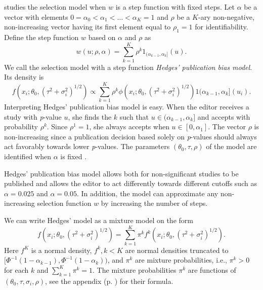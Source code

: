 \documentclass[article]{ajs}
\numberwithin{equation}{section}
\numberwithin{figure}{section}
\theoremstyle{plain}
\theoremstyle{definition}
\theoremstyle{definition}
\theoremstyle{plain}
\renewcommand{\sqrt}[1]{{(#1)^{1/2}}}
\begin{document}
\citet{hedges1992modeling} studies the selection model when $w$ is a step function with fixed steps. Let $\alpha$ be a vector with elements $0=\alpha_{0}<\alpha_{1}<\ldots<\alpha_{K}=1$ and $\rho$ be a $K$-ary non-negative, non-increasing vector having its first element equal to $\rho_{1}=1$ for identifiability. Define the step function $w$ based on $\alpha$ and $\rho$ as
\begin{equation}
w(u;\rho,\alpha)=\sum_{k=1}^{K}\rho^{k}1_{(\alpha_{k-1},\alpha_{k}]}(u).\label{eq:step function}
\end{equation}
We call the selection model with a step function \emph{Hedges' publication bias model}. Its density is
\begin{equation}
f(x_{i};\theta_{0},\sqrt{\tau^{2}+\sigma_{i}^{2}})\propto\sum_{k=1}^{K}\rho^{k}\phi(x_{i};\theta_{0},\sqrt{\tau^{2}+\sigma_{i}^{2}})1{(\alpha_{k-1},\alpha_{k}]}(u_{i}).\label{eq:hedges model}
\end{equation}
Interpreting Hedges' publication bias model is easy. When the editor receives a study with \textit{p}-value $u$, she finds the $k$ such that $u\in(\alpha_{k-1},\alpha_{k}]$ and accepts with probability $\rho^{k}$. Since $\rho^{1}=1$, she always accepts when $u\in[0,\alpha_{1}]$. The vector $\rho$ is non-increasing since a publication decision based solely on \textit{p}-values should always act favorably towards lower \textit{p}-values. The parameters $(\theta_{0},\tau,\rho)$ of the model are identified when $\alpha$ is fixed \citep[Web Appendix A]{moss2019modelling}.

Hedges' publication bias model allows both for non-significant studies to be published and allows the editor to act differently towards different cutoffs such as $\alpha=0.025$ and $\alpha=0.05$. In addition, the model can approximate any non-increasing selection function $w$ by increasing the number of steps.

We can write Hedges' model as a mixture model on the form
\begin{equation}
f(x_{i};\theta_{0},\sqrt{\tau^{2}+\sigma_{i}^{2}})=\sum_{k=1}^{K}\pi^{k}f^{k}(x_{i};\theta_{0},\sqrt{\tau^{2}+\sigma_{i}^{2}}).\label{eq:mixture model formulation}
\end{equation}
Here $f^{K}$ is a normal density, $f^{k},k<K$ are normal densities
truncated to $[\Phi^{-1}(1-\alpha_{k-1}),\Phi^{-1}(1-\alpha_k))$, and $\pi^{k}$ are mixture probabilities, i.e., $\pi^{k}>0$ for each $k$ and $\sum_{k=1}^{K}\pi^{k}=1$. The mixture probabilities $\pi^{k}$ are functions of $(\theta_{0},\tau,\sigma_{i},\rho)$, see the appendix (p. \pageref{eq:pi_i formula}) for their formula.
\end{document}

